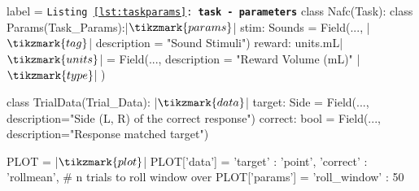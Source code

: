 \begin{listing}[h!]
\begin{pythoncode*}{label = \texttt{Listing \ref{lst:taskparams}: \textbf{task - parameters}}}
class Nafc(Task):
    class Params(Task_Params):|$\tikzmark{params}$|
        stim: Sounds = Field(...,          |$\tikzmark{tag}$|
            description = "Sound Stimuli") 
        reward: units.mL|$\tikzmark{units}$| = Field(...,
            description = "Reward Volume (mL)" |$\tikzmark{type}$|
        )

    class TrialData(Trial_Data): |$\tikzmark{data}$|
        target: Side = Field(..., 
            description="Side (L, R) of the correct response")
        correct: bool = Field(...,
            description="Response matched target")

    PLOT = {} |$\tikzmark{plot}$|
    PLOT['data']  =  {'target'  : 'point',
                      'correct' : 'rollmean'},
    # n trials to roll window over
    PLOT['params'] = {'roll_window' : 50}


\end{pythoncode*}
\end{listing}
